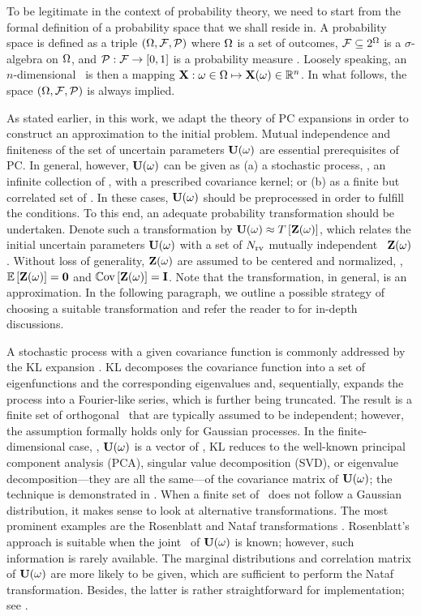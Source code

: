 To be legitimate in the context of probability theory, we need to start from the formal definition of a probability space that we shall reside in. A probability space is defined as a triple $(\Omega, \mathcal{F}, \mathcal{P})$ where $\Omega$ is a set of outcomes, $\mathcal{F} \subseteq 2^\Omega$ is a $\sigma$-algebra on $\Omega$, and $\mathcal{P}: \mathcal{F} \to [0, 1]$ is a probability measure \cite{durrett2010}. Loosely speaking, an $n$-dimensional \rv\ is then a mapping $\mathbf{X}: \omega \in \Omega \mapsto \mathbf{X}(\omega) \in \mathbb{R}^n$. In what follows, the space $(\Omega, \mathcal{F}, \mathcal{P})$ is always implied.

As stated earlier, in this work, we adapt the theory of PC expansions in order to construct an approximation to the initial problem. Mutual independence and finiteness of the set of uncertain parameters $\mathbf{U}(\omega)$ are essential prerequisites of PC. In general, however, $\mathbf{U}(\omega)$ can be given as (a) a stochastic process, \ie, an infinite collection of \rvs, with a prescribed covariance kernel; or (b) as a finite but correlated set of \rvs. In these cases, $\mathbf{U}(\omega)$ should be preprocessed in order to fulfill the conditions. To this end, an adequate probability transformation should be undertaken. Denote such a transformation by $\mathbf{U}(\omega) \approx T\left[\mathbf{Z}(\omega)\right]$, which relates the initial uncertain parameters $\mathbf{U}(\omega)$ with a set of ${N_\text{rv}}$ mutually independent \rvs\ $\mathbf{Z}(\omega)$. Without loss of generality, $\mathbf{Z}(\omega)$ are assumed to be centered and normalized, \ie, $\oExp{\vZ(\o)} = \mZero$ and $\oCov{\vZ(\o)} = \mI$. Note that the transformation, in general, is an approximation. In the following paragraph, we outline a possible strategy of choosing a suitable transformation and refer the reader to \cite{xiu2010, eldred2009} for in-depth discussions.

A stochastic process with a given covariance function is commonly addressed by the KL expansion \cite{xiu2010, maitre2010, ghanem1991}. KL decomposes the covariance function into a set of eigenfunctions and the corresponding eigenvalues and, sequentially, expands the process into a Fourier-like series, which is further being truncated. The result is a finite set of orthogonal \rvs\ that are typically assumed to be independent; however, the assumption formally holds only for Gaussian processes. In the finite-dimensional case, \ie, $\mathbf{U}(\omega)$ is a vector of \rvs, KL reduces to the well-known principal component analysis (PCA), singular value decomposition (SVD), or eigenvalue decomposition---they are all the same---of the covariance matrix of $\mathbf{U}(\omega)$; the technique is demonstrated in . When a finite set of \rvs\ does not follow a Gaussian distribution, it makes sense to look at alternative transformations. The most prominent examples are the Rosenblatt and Nataf transformations \cite{eldred2009, li2008}. Rosenblatt's approach is suitable when the joint \pdf\ of $\mathbf{U}(\omega)$ is known; however, such information is rarely available. The marginal distributions and correlation matrix of $\mathbf{U}(\omega)$ are more likely to be given, which are sufficient to perform the Nataf transformation. Besides, the latter is rather straightforward for implementation; see \cite{li2008}.
